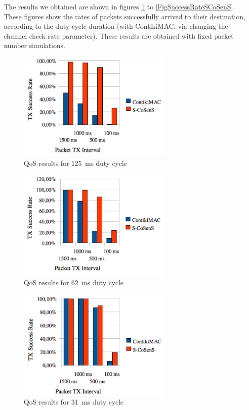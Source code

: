 \documentclass[a4paper,twoside]{article}
\begin{document}
The results we obtained are shown in figures \ref{FigSuccessRate8Hz} to
\ref{FigSuccessRateSCoSenS}. These figures show the rates of packets
successfully arrived to their destination, according to the duty cycle
duration (with ContikiMAC: via changing the channel check rate parameter).
These results are obtained with fixed packet number simulations.

\begin{figure}
  \centering
  \includegraphics[width=7.5cm]{graphes/QoS8Hz.png}
  \caption{QoS results for 125~ms duty cycle}
  \label{FigSuccessRate8Hz}
\end{figure}
\begin{figure}
  \centering
  \includegraphics[width=7.5cm]{graphes/QoS16Hz.png}
  \caption{QoS results for 62~ms duty cycle}
  \label{FigSuccessRate16Hz}
\end{figure}
\begin{figure}
  \centering
  \includegraphics[width=7.5cm]{graphes/QoS32Hz.png}
  \caption{QoS results for 31~ms duty cycle}
  \label{FigSuccessRate32Hz}
\end{figure}
\end{document}
